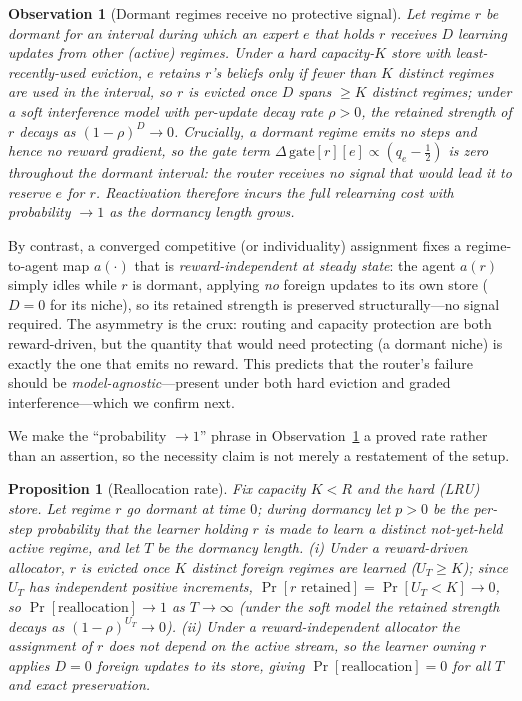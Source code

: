 \documentclass{article}
\newtheorem{proposition}{Proposition}
\newtheorem{observation}{Observation}
\begin{document}
\begin{observation}[Dormant regimes receive no protective signal]
\label{obs:router}
Let regime $r$ be dormant for an interval during which an expert $e$ that holds
$r$ receives $D$ learning updates from \emph{other} (active) regimes. Under a hard
capacity-$K$ store with least-recently-used eviction, $e$ retains $r$'s beliefs only
if fewer than $K$ distinct regimes are used in the interval, so $r$ is evicted once
$D$ spans $\ge K$ distinct regimes; under a soft interference model with per-update
decay rate $\rho>0$, the retained strength of $r$ decays as $(1-\rho)^{D}\!\to 0$.
Crucially, a dormant regime emits \emph{no steps and hence no reward gradient}, so
the gate term $\Delta\,\mathrm{gate}[r][e]\propto(q_e-\tfrac12)$ is zero throughout
the dormant interval: the router receives \emph{no signal that would lead it to
reserve $e$ for $r$}. Reactivation therefore incurs the full relearning cost with
probability $\to 1$ as the dormancy length grows.
\end{observation}

By contrast, a converged competitive (or individuality) assignment fixes a
regime-to-agent map $a(\cdot)$ that is \emph{reward-independent at steady state}:
the agent $a(r)$ simply idles while $r$ is dormant, applying \emph{no} foreign
updates to its own store ($D=0$ for its niche), so its retained strength is
preserved structurally---no signal required. The asymmetry is the crux: routing and
capacity protection are both reward-driven, but the quantity that would need
protecting (a dormant niche) is exactly the one that emits no reward. This predicts
that the router's failure should be \emph{model-agnostic}---present under both hard
eviction and graded interference---which we confirm next.

We make the ``probability $\to 1$'' phrase in Observation~\ref{obs:router} a proved
rate rather than an assertion, so the necessity claim is not merely a restatement of
the setup.

\begin{proposition}[Reallocation rate]
\label{prop:realloc}
Fix capacity $K<R$ and the hard (LRU) store. Let regime $r$ go dormant at time $0$;
during dormancy let $p>0$ be the per-step probability that the learner holding $r$ is
made to learn a distinct not-yet-held active regime, and let $T$ be the dormancy
length. (i) Under a reward-driven allocator, $r$ is evicted once $K$ distinct foreign
regimes are learned ($U_T\ge K$); since $U_T$ has independent positive increments,
$\Pr[r\text{ retained}]=\Pr[U_T<K]\to 0$, so $\Pr[\text{reallocation}]\to 1$ as
$T\to\infty$ (under the soft model the retained strength decays as
$(1-\rho)^{U_T}\to0$). (ii) Under a reward-independent allocator the assignment of
$r$ does not depend on the active stream, so the learner owning $r$ applies $D=0$
foreign updates to its store, giving $\Pr[\text{reallocation}]=0$ for all $T$ and
exact preservation.
\end{proposition}
\end{document}
